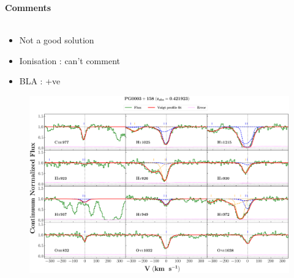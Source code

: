 \documentclass[12pt]{report}
\begin{document}
\newpage

\textbf{Comments}
\\\\
\begin{itemize}
    \item Not a good solution
    \item Ionisation : can't comment
    \item BLA : +ve
\end{itemize}



\newpage


\begin{landscape}

    \begin{figure}
    \centering
    \vspace{-20mm}
    \hspace*{-35mm}
    \includegraphics[width=1.25\linewidth]{System-Plots/PG0003+158_z=0.421923_sys_plot.png}
    \end{figure}
    
\end{landscape}
\end{document}

